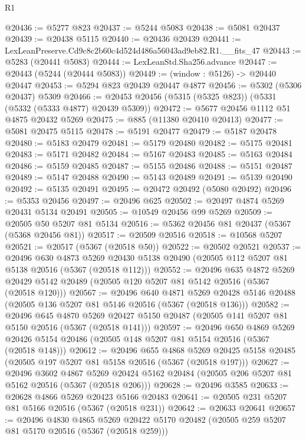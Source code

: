 \begin{lexlean}{R1}
\begin{coremodule}
@20436 := @5277 @823
@20437 := @5244 @5083
@20438 := @5081 @20437
@20439 := @20438 @5115
@20440 := @20436 @20439
@20441 := LexLeanPreserve.Cd9c8c2b60c4d524d486a56043ad9eb82.R1.__fits_47
@20443 := @5283 (@20441 @5083)
@20444 := LexLeanStd.Sha256.advance
@20447 := @20443 (@5244 (@20444 @5083))
@20449 := (window : @5126) -> @20440 @20447
@20453 := @5294 @823 @20439 @20447 @4877
@20456 := @5302 (@5306 @20437) @5309
@20466 := @20453 @20456 (@5315 (@5325 @823)) (@5331 (@5332 (@5333 @4877) @20439 @5309))
@20472 := @5677 @20456 @1112 @51 @4875 @20432 @5269
@20475 := @885 (@11380 @20410 @20413)
@20477 := @5081 @20475 @5115
@20478 := @5191 @20477
@20479 := @5187 @20478
@20480 := @5183 @20479
@20481 := @5179 @20480
@20482 := @5175 @20481
@20483 := @5171 @20482
@20484 := @5167 @20483
@20485 := @5163 @20484
@20486 := @5159 @20485
@20487 := @5155 @20486
@20488 := @5151 @20487
@20489 := @5147 @20488
@20490 := @5143 @20489
@20491 := @5139 @20490
@20492 := @5135 @20491
@20495 := @20472 @20492 (@5080 @20492)
@20496 := @5353 @20456
@20497 := @20496 @625
@20502 := @20497 @4874 @5269 @20431 @5134 @20491
@20505 := @10549 @20456 @99 @5269
@20509 := @20505 @50 @5207 @81 @5134
@20516 := @5362 @20456 @81 @20437 (@5367 (@5368 @20456 @81))
@20517 := @20509 @20516
@20518 := @10568 @5207
@20521 := @20517 (@5367 (@20518 @50))
@20522 := @20502 @20521
@20537 := @20496
    @630
    @4873
    @5269
    @20430
    @5138
    @20490
    (@20505 @112 @5207 @81 @5138 @20516 (@5367 (@20518 @112)))
@20552 := @20496
    @635
    @4872
    @5269
    @20429
    @5142
    @20489
    (@20505 @120 @5207 @81 @5142 @20516 (@5367 (@20518 @120)))
@20567 := @20496
    @640
    @4871
    @5269
    @20428
    @5146
    @20488
    (@20505 @136 @5207 @81 @5146 @20516 (@5367 (@20518 @136)))
@20582 := @20496
    @645
    @4870
    @5269
    @20427
    @5150
    @20487
    (@20505 @141 @5207 @81 @5150 @20516 (@5367 (@20518 @141)))
@20597 := @20496
    @650
    @4869
    @5269
    @20426
    @5154
    @20486
    (@20505 @148 @5207 @81 @5154 @20516 (@5367 (@20518 @148)))
@20612 := @20496
    @655
    @4868
    @5269
    @20425
    @5158
    @20485
    (@20505 @197 @5207 @81 @5158 @20516 (@5367 (@20518 @197)))
@20627 := @20496
    @3602
    @4867
    @5269
    @20424
    @5162
    @20484
    (@20505 @206 @5207 @81 @5162 @20516 (@5367 (@20518 @206)))
@20628 := @20496 @3585
@20633 := @20628 @4866 @5269 @20423 @5166 @20483
@20641 := @20505 @231 @5207 @81 @5166 @20516 (@5367 (@20518 @231))
@20642 := @20633 @20641
@20657 := @20496
    @4830
    @4865
    @5269
    @20422
    @5170
    @20482
    (@20505 @259 @5207 @81 @5170 @20516 (@5367 (@20518 @259)))

\end{coremodule}
\end{lexlean}
